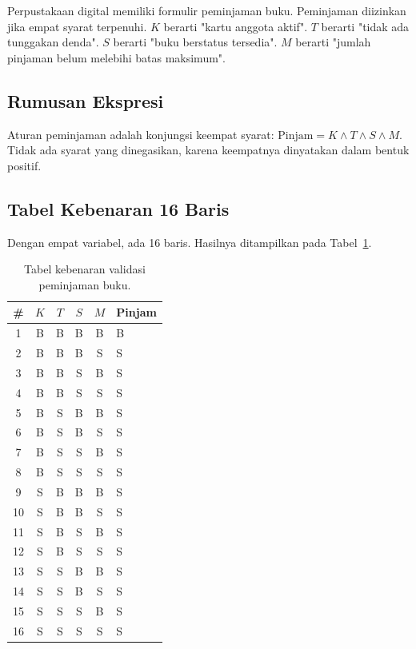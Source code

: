 \documentclass[11pt,a4paper]{article}
\begin{document}
Perpustakaan digital memiliki formulir peminjaman buku. Peminjaman diizinkan jika empat syarat terpenuhi. $K$ berarti "kartu anggota aktif". $T$ berarti "tidak ada tunggakan denda". $S$ berarti "buku berstatus tersedia". $M$ berarti "jumlah pinjaman belum melebihi batas maksimum".

\subsection{Rumusan Ekspresi}

Aturan peminjaman adalah konjungsi keempat syarat: $\text{Pinjam}=K \wedge T \wedge S \wedge M$. Tidak ada syarat yang dinegasikan, karena keempatnya dinyatakan dalam bentuk positif.

\subsection{Tabel Kebenaran 16 Baris}

Dengan empat variabel, ada 16 baris. Hasilnya ditampilkan pada Tabel~\ref{tab:peminjaman-16}.

\begin{table}[H]
	\centering
	\caption{Tabel kebenaran validasi peminjaman buku.}
	\label{tab:peminjaman-16}
	\footnotesize
	\begin{tabular}{c c c c c l}
		\toprule
		\# & $K$ & $T$ & $S$ & $M$ & Pinjam \\
		\midrule
		1 & B & B & B & B & B \\
		2 & B & B & B & S & S \\
		3 & B & B & S & B & S \\
		4 & B & B & S & S & S \\
		5 & B & S & B & B & S \\
		6 & B & S & B & S & S \\
		7 & B & S & S & B & S \\
		8 & B & S & S & S & S \\
		9 & S & B & B & B & S \\
		10 & S & B & B & S & S \\
		11 & S & B & S & B & S \\
		12 & S & B & S & S & S \\
		13 & S & S & B & B & S \\
		14 & S & S & B & S & S \\
		15 & S & S & S & B & S \\
		16 & S & S & S & S & S \\
		\bottomrule
	\end{tabular}
\end{table}
\end{document}
